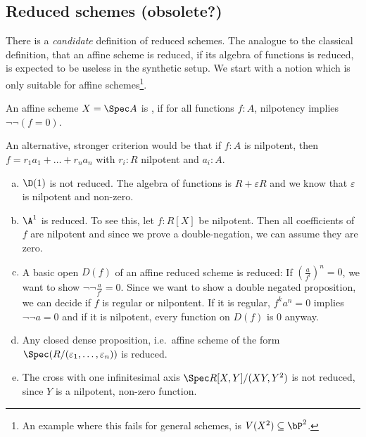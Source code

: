 
\subsection{Reduced schemes (obsolete?)}


There is a \emph{candidate} definition of reduced schemes.
The analogue to the classical definition, that an affine scheme is reduced,
if its algebra of functions is reduced, is expected to be useless in the synthetic setup.
We start with a notion which is only suitable for affine schemes\footnote{An example where this fails for general schemes, is $V(X^2)\subseteq\bP^2$.}.

\begin{definition}\label{candidate-reduced}
  An affine scheme $X=\Spec A$ is ,
  if for all functions $f:A$, nilpotency implies $\neg\neg (f=0)$.
\end{definition}

An alternative, stronger criterion would be that if $f : A$ is nilpotent, then
$f = r_1 a_1 + \ldots + r_n a_n$ with $r_i : R$ nilpotent and $a_i : A$.

\begin{example}
  \begin{enumerate}[(a)]
  \item $\D(1)$ is not reduced.
    The algebra of functions is $R+\varepsilon R$ and we know that $\varepsilon$ is nilpotent and non-zero.
  \item $\A^1$ is reduced. To see this, let $f:R[X]$ be nilpotent.
    Then all coefficients of $f$ are nilpotent and since we prove a double-negation,
    we can assume they are zero.
  \item A basic open $D(f)$ of an affine reduced scheme is reduced:
    If $\left(\frac{a}{f^l}\right)^n=0$, we want to show $\neg\neg \frac{a}{f^l} = 0$.
    Since we want to show a double negated proposition, we can decide if $f$ is regular or nilpontent.
    If it is regular, $f^ka^n=0$ implies $\neg\neg a = 0$ and if it is nilpotent, every function on $D(f)$ is $0$ anyway.
  \item Any closed dense proposition, i.e.\ affine scheme of the form $\Spec (R/(\varepsilon_1,\dots,\varepsilon_n))$ is reduced.
  \item The cross with one infinitesimal axis $\Spec R[X,Y]/(XY,Y^2)$ is not reduced, since $Y$ is a nilpotent, non-zero function.
  \end{enumerate}
\end{example}

